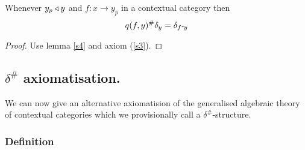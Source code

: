 \documentclass[10pt,a4paper]{scrartcl}
\renewcommand{\sub}{^*\kern-1pt}
\newcommand{\hash}{^\#}
\begin{document}
\begin{lemma}
\label {deltalemma2}
Whenever $y_p \triangleleft y$ and
$f: x \longrightarrow y_p$ in a contextual category  then 
\begin{equation*}
q(f,y) \hash \delta_y   = \delta_{f \sub y}
\end{equation*}
\end{lemma}
\begin{proof}
Use lemma \ref{s4} and axiom (\ref{s3}).
\end{proof}


\subsection{$\delta\hash$ axiomatisation.}
We can now give an alternative axiomatision of the generalised algebraic theory of contextual categories which we provisionally call a $\delta\hash$-structure. 

\subsubsection{Definition}
\end{document}
